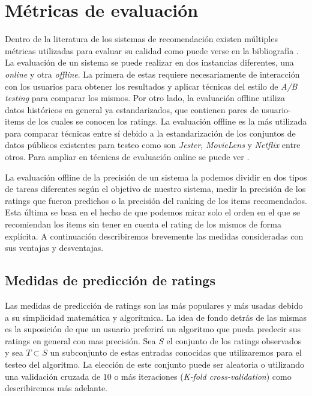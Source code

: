 \documentclass[hidelinks,12pt,a4paper]{book}
\theoremstyle{plain}
\theoremstyle{definition}
\begin{document}
\section{Métricas de evaluación}

Dentro de la literatura de los sistemas de recomendación existen múltiples métricas utilizadas para evaluar su calidad como puede verse en la bibliografía \cite{agg} \cite{evaluateshani} \cite{evaluate-hertlocker}. La evaluación de un sistema se puede realizar en dos instancias diferentes, una \textit{online} y otra \textit{offline}. La primera de estas requiere necesariamente de interacción con los usuarios para obtener los resultados y aplicar técnicas del estilo de \textit{A/B testing} para comparar los mismos. Por otro lado, la evaluación offline utiliza datos históricos en general ya estandarizados, que contienen pares de usuario-items de los cuales se conocen los ratings. La evaluación offline es la más utilizada para comparar técnicas entre sí \cite{agg} debido a la estandarización de los conjuntos de datos públicos existentes para testeo como son \textit{Jester}, \textit{MovieLens} y \textit{Netflix} entre otros\cite{chen2012collaborative}. Para ampliar en técnicas de evaluación online se puede ver \cite{evaluateshani} \cite{kohavi2009controlled}.

La evaluación offline de la precisión de un sistema la podemos dividir en dos tipos de tareas diferentes según el objetivo de nuestro sistema, medir la precisión de los ratings que fueron predichos o la precisión del ranking de los items recomendados. Esta última se basa en el hecho de que podemos mirar solo el orden en el que se recomiendan los items sin tener en cuenta el rating de los mismos de forma explícita. A continuación describiremos brevemente las medidas consideradas con sus ventajas y desventajas.

\subsection{Medidas de predicción de ratings}

Las medidas de predicción de ratings son las más populares y más usadas debido a su simplicidad matemática y algorítmica. La idea de fondo detrás de las mismas es la suposición de que un usuario preferirá un algoritmo que pueda predecir sus ratings en general con mas precisión. Sea $S$ el conjunto de los ratings observados y sea $T \subset S$ un subconjunto de estas entradas conocidas que utilizaremos para el testeo del algoritmo. La elección de este conjunto puede ser aleatoria o utilizando una validación cruzada de $10$ o más iteraciones (\textit{K-fold cross-validation}) como describiremos más adelante.
\end{document}
